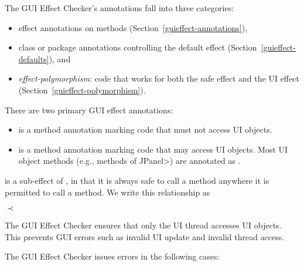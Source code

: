 
The GUI Effect Checker's annotations fall into three categories:

\begin{itemize}
\item
  effect annotations on methods (Section~\ref{guieffect-annotations}),
\item
 class or package annotations controlling the default effect (Section~\ref{guieffect-defaults}), and
\item
  \emph{effect-polymorphism}:  code that works for both the safe effect and
  the UI effect (Section~\ref{guieffect-polymorphism}).
\end{itemize}



There are two primary GUI effect annotations:
\begin{itemize}
\item
  is a method annotation marking code that must not
  access UI objects.
\item
  is a method annotation marking code that may access
  UI objects.  Most UI object methods (e.g., methods of \<JPanel>) are
  annotated as .
\end{itemize}

 is a sub-effect of , in that it is always safe to
call a  method anywhere it is permitted to call a
 method.  We write this relationship as

\centerline{ $\prec$ }



The GUI Effect Checker ensures that only the UI thread accesses UI objects.
This prevents GUI errors such
as invalid UI update and invalid thread access.

The GUI Effect Checker issues errors in the following cases:


